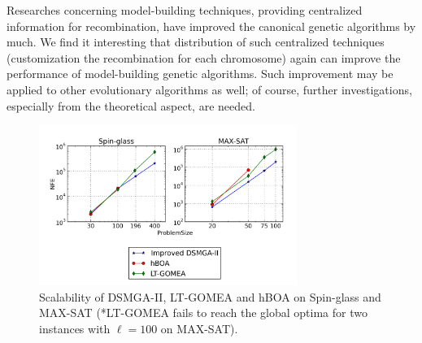 \documentclass{sig-alternate-05-2015}
\begin{document}
Researches concerning model-building techniques, providing centralized information for recombination, have improved the canonical genetic algorithms by much. 
We find it interesting that distribution of such centralized techniques (customization the recombination for each chromosome) again can improve the performance of model-building genetic algorithms. 
Such improvement may be applied to other evolutionary algorithms as well; of course,  further investigations, especially from the theoretical aspect, are needed.  


\begin{figure}
\centering
\includegraphics[width=3.3in]{spin_satResults}
\caption{Scalability of DSMGA-II, LT-GOMEA and hBOA on Spin-glass and MAX-SAT (*LT-GOMEA fails to reach the global optima for two instances with $\ell=100$ on MAX-SAT).}
\end{figure}


%

%
%
\end{document}
